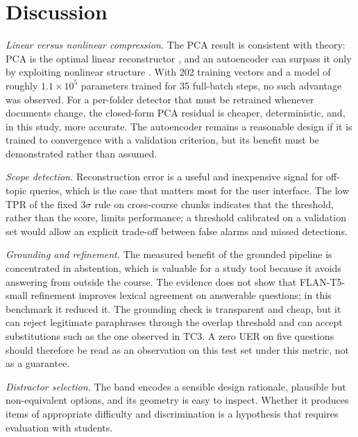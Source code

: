 \documentclass[conference]{IEEEtran}
\begin{document}
\section{Discussion}
\emph{Linear versus nonlinear compression.} The PCA result is consistent with theory: PCA is the optimal linear reconstructor \cite{eckart1936}, and an autoencoder can surpass it only by exploiting nonlinear structure \cite{baldi1989}. With 202 training vectors and a model of roughly $1.1\times10^5$ parameters trained for 35 full-batch steps, no such advantage was observed. For a per-folder detector that must be retrained whenever documents change, the closed-form PCA residual is cheaper, deterministic, and, in this study, more accurate. The autoencoder remains a reasonable design if it is trained to convergence with a validation criterion, but its benefit must be demonstrated rather than assumed.

\emph{Scope detection.} Reconstruction error is a useful and inexpensive signal for off-topic queries, which is the case that matters most for the user interface. The low TPR of the fixed $3\sigma$ rule on cross-course chunks indicates that the threshold, rather than the score, limits performance; a threshold calibrated on a validation set would allow an explicit trade-off between false alarms and missed detections.

\emph{Grounding and refinement.} The measured benefit of the grounded pipeline is concentrated in abstention, which is valuable for a study tool because it avoids answering from outside the course. The evidence does not show that FLAN-T5-small refinement improves lexical agreement on answerable questions; in this benchmark it reduced it. The grounding check is transparent and cheap, but it can reject legitimate paraphrases through the overlap threshold and can accept substitutions such as the one observed in TC3. A zero UER on five questions should therefore be read as an observation on this test set under this metric, not as a guarantee.

\emph{Distractor selection.} The band encodes a sensible design rationale, plausible but non-equivalent options, and its geometry is easy to inspect. Whether it produces items of appropriate difficulty and discrimination is a hypothesis that requires evaluation with students.
\end{document}
